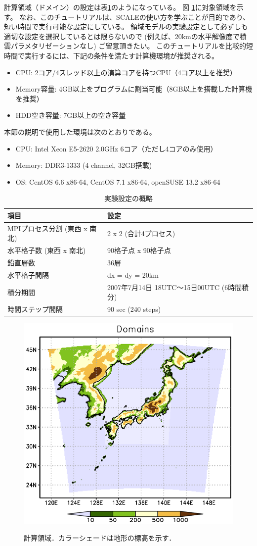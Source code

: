 計算領域（ドメイン）の設定は表\ref{tab:grids}のようになっている。
図 \ref{fig:tutrial_real_domain}に対象領域を示す。
なお、このチュートリアルは、SCALEの使い方を学ぶことが目的であり、
短い時間で実行可能な設定にしている。
領域モデルの実験設定として必ずしも適切な設定を選択しているとは限らないので
(例えば、20kmの水平解像度で積雲パラメタリゼーションなし)
ご留意頂きたい。
このチュートリアルを比較的短時間で実行するには、下記の条件を満たす計算機環境が推奨される。
\begin{itemize}
\item CPU: 2コア/4スレッド以上の演算コアを持つCPU（4コア以上を推奨）
\item Memory容量: 4GB以上をプログラムに割当可能（8GB以上を搭載した計算機を推奨）
\item HDD空き容量: 7GB以上の空き容量
\end{itemize}
本節の説明で使用した環境は次のとおりである。
\begin{itemize}
\item CPU: Intel Xeon E5-2620 2.0GHz 6コア（ただし4コアのみ使用）
\item Memory: DDR3-1333 (4 channel, 32GB搭載)
\item OS: CentOS 6.6 x86-64, CentOS 7.1 x86-64, openSUSE 13.2 x86-64
\end{itemize}


\begin{table}[h]
\begin{center}
  \caption{実験設定の概略}
  \label{tab:grids}
  \begin{tabularx}{150mm}{|l|X|} \hline
    \rowcolor[gray]{0.9} 項目 & 設定 \\ \hline
    MPIプロセス分割 (東西 x 南北) & 2 x 2 (合計4プロセス) \\ \hline
    水平格子数 (東西 x 南北) & 90格子点 x 90格子点 \\ \hline
    鉛直層数                 & 36層                  \\ \hline
    水平格子間隔             & dx = dy = 20km       \\ \hline
    積分期間 & 2007年7月14日 18UTC～15日00UTC (6時間積分) \\ \hline
    時間ステップ間隔 & 90 sec (240 steps) \\ \hline
  \end{tabularx}
\end{center}
\end{table}

\begin{figure}[tb]
\begin{center}
  \includegraphics[width=0.5\hsize]{./figure/real_domain.eps}\\
  \caption{計算領域．カラーシェードは地形の標高を示す．}
  \label{fig:tutrial_real_domain}
\end{center}
\end{figure}


